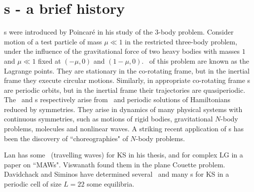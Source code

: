%


\section{{\Rpo s} - a brief history}

{\Rpo s} were introduced by Poincar\'e in his study of 
the 3-body problem.
Consider motion of a test particle of mass
$\mu \ll 1$ in the
restricted three-body problem,
under the
influence of the gravitational force of two heavy bodies with masses $1$ and
$\mu \ll 1$ fixed at $(-\mu,0)$ and $(1-\mu,0)$. \Reqva\ of this problem
are known as the Lagrange points. They are stationary in
the co-rotating frame, but
in the inertial frame they execute circular motions.
Similarly, in appropriate co-rotating frame
{\rpo s} are periodic orbits, 
but in the inertial frame their trajectories
are quasiperiodic. 
The \reqva\ and \rpo s 
respectively arise from
\eqva\ and periodic solutions of Hamiltonians reduced by symmetries.
They arise in dynamics of many physical systems
with continuous symmetries, such as motions of rigid bodies, gravitational
$N$-body problems, molecules and nonlinear waves.
A striking recent application of \rpo s has been the discovery
of ``choreographies" of $N$-body problems.

Lan has some \reqva\ (travelling waves) for KS in his
thesis, %
 and for complex LG in a paper on ``MAWs".
Viswanath %
found them in the plane Couette problem.
Davidchack and Siminos have determined 
several \eqva\ and many \rpo s for 
KS in a periodic cell of size $L=22$ some equilibria.


